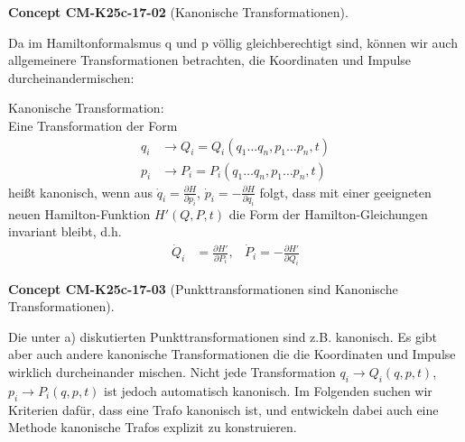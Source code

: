 \documentclass[10pt, letterpaper]{article}
\newcommand{\CustomHeading}[3]{%
  \par\medskip\noindent%
  \textbf{#1 #2} \textnormal{(#3)}.\enskip%
}
\newenvironment{CONC}[2]{\CustomHeading{Concept}{#1}{#2}}{}
\begin{document}
\begin{CONC}{CM-K25c-17-02}{Kanonische Transformationen}
Da im Hamiltonformalsmus q und p völlig gleichberechtigt sind, können wir auch allgemeinere Transformationen betrachten, die Koordinaten und Impulse durcheinandermischen:


Kanonische Transformation:\\
Eine Transformation der Form
\begin{align*}
q_i &\to Q_i = Q_i(q_1 \ldots q_n, p_1 \ldots p_n, t)\\
p_i &\to P_i = P_i(q_1 \ldots q_n, p_1 \ldots p_n, t)
\end{align*}
heißt kanonisch, wenn aus $\dot{q}_i = \frac{\partial H}{\partial p_i}$, $\dot{p}_i = -\frac{\partial H}{\partial q_i}$ folgt, dass mit einer geeigneten neuen Hamilton-Funktion $H'(Q,P,t)$ die Form der Hamilton-Gleichungen invariant bleibt, d.h.
\begin{align*}
\dot{Q}_i &= \frac{\partial H'}{\partial P_i}, & \dot{P}_i = -\frac{\partial H'}{\partial Q_i}
\end{align*}
\end{CONC}

\begin{CONC}{CM-K25c-17-03}{Punkttransformationen sind Kanonische Transformationen}
Die unter a) diskutierten Punkttransformationen sind z.B. kanonisch. Es gibt aber auch andere kanonische Transformationen die die Koordinaten und Impulse wirklich durcheinander mischen. Nicht jede Transformation $q_i \to Q_i(q,p,t)$, $p_i \to P_i(q,p,t)$ ist jedoch automatisch kanonisch. Im Folgenden suchen wir Kriterien dafür, dass eine Trafo kanonisch ist, und entwickeln dabei auch eine Methode kanonische Trafos explizit zu konstruieren.
\end{CONC}
\end{document}
